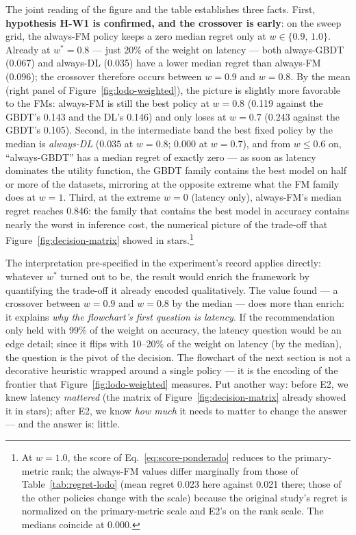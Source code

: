 The joint reading of the figure and the table establishes three
facts. First, \textbf{hypothesis H-W1 is confirmed, and the
crossover is early}: on the sweep grid, the always-FM policy keeps a
zero median regret only at $w \in \{0.9,\, 1.0\}$. Already at
$w^{*}{=}0.8$ --- just 20\% of the weight on latency --- both
always-GBDT (0.067) and always-DL (0.035) have a lower median regret
than always-FM (0.096); the crossover therefore occurs between
$w{=}0.9$ and $w{=}0.8$. By the mean (right panel of
Figure~\ref{fig:lodo-weighted}), the picture is slightly more
favorable to the FMs: always-FM is still the best policy at
$w{=}0.8$ (0.119 against the GBDT's 0.143 and the DL's 0.146) and
only loses at $w{=}0.7$ (0.243 against the GBDT's 0.105). Second, in
the intermediate band the best fixed policy by the median is
\emph{always-DL} ($0.035$ at $w{=}0.8$; $0.000$ at $w{=}0.7$), and
from $w \leq 0.6$ on, ``always-GBDT'' has a median regret of exactly
zero --- as soon as latency dominates the utility function, the GBDT
family contains the best model on half or more of the datasets,
mirroring at the opposite extreme what the FM family does at
$w{=}1$. Third, at the extreme $w{=}0$ (latency only), always-FM's
median regret reaches 0.846: the family that contains the best model
in accuracy contains nearly the worst in inference cost, the
numerical picture of the trade-off that
Figure~\ref{fig:decision-matrix} showed in stars.\footnote{At
$w{=}1.0$, the score of Eq.~\ref{eq:score-ponderado} reduces to the
primary-metric rank; the always-FM values differ marginally from
those of
Table~\ref{tab:regret-lodo} (mean regret 0.023 here
against 0.021 there; those of the other policies change with the
scale) because the original study's regret is
normalized on the primary-metric scale and E2's on the rank scale.
The medians coincide at 0.000.}

The interpretation pre-specified in the experiment's record applies
directly: whatever $w^{*}$ turned out to be, the result would enrich
the framework by quantifying the trade-off it already encoded
qualitatively. The value found --- a crossover between $w{=}0.9$ and
$w{=}0.8$ by the median --- does more than enrich: it explains
\emph{why the flowchart's first question is latency}. If the
recommendation only held with 99\% of the weight on accuracy, the
latency question would be an edge detail; since it flips with
10--20\% of the weight on latency (by the median), the question is
the pivot of the decision. The flowchart of the next section is not a decorative
heuristic wrapped around a single policy --- it is the encoding of the
frontier that Figure~\ref{fig:lodo-weighted} measures. Put another
way: before E2, we knew latency \emph{mattered} (the matrix of
Figure~\ref{fig:decision-matrix} already showed it in stars); after
E2, we know \emph{how much} it needs to matter to change the answer
--- and the answer is: little.

